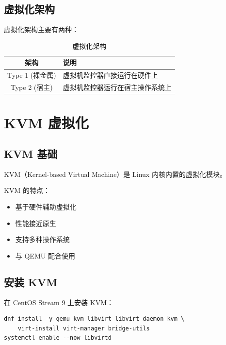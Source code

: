 \documentclass[12pt,UTF8]{ctexbook}
\begin{document}
\section{虚拟化架构}
\label{sec:virtualization_architecture}

虚拟化架构主要有两种：

\begin{table}[htbp]
    \centering
    \caption{虚拟化架构}
    \begin{tabular}{|c|p{8cm}|}
        \hline
        \textbf{架构} & \textbf{说明} \\
        \hline
        Type 1 (裸金属) & 虚拟机监控器直接运行在硬件上 \\
        \hline
        Type 2 (宿主) & 虚拟机监控器运行在宿主操作系统上 \\
        \hline
    \end{tabular}
\end{table}

\chapter{KVM 虚拟化}
\label{chap:kvm}

\section{KVM 基础}
\label{sec:kvm_basics}

KVM（Kernel-based Virtual Machine）是 Linux 内核内置的虚拟化模块。

KVM 的特点：
\begin{itemize}
    \item 基于硬件辅助虚拟化
    \item 性能接近原生
    \item 支持多种操作系统
    \item 与 QEMU 配合使用
\end{itemize}

\section{安装 KVM}
\label{sec:install_kvm}

在 CentOS Stream 9 上安装 KVM：

\begin{verbatim}
dnf install -y qemu-kvm libvirt libvirt-daemon-kvm \
    virt-install virt-manager bridge-utils
systemctl enable --now libvirtd
\end{verbatim}
\end{document}
